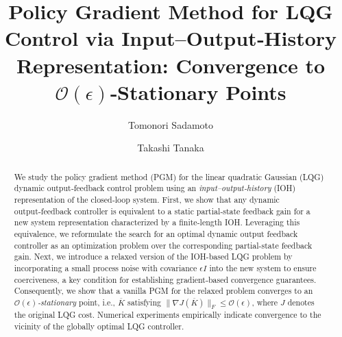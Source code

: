\documentclass[preprint,5p,times,twocolumn]{elsarticle}
\begin{document}
\begin{frontmatter}

\title{Policy Gradient Method for LQG Control via Input–Output‑History Representation: Convergence to $\mathcal{O}(\epsilon)$‑Stationary Points
}


\author[uec]{Tomonori Sadamoto}

\author[purdue]{Takashi Tanaka}




\begin{abstract}
We study the policy gradient method (PGM) for the linear quadratic Gaussian (LQG) dynamic output‑feedback control problem using an \emph{input–output‑history} (IOH) representation of the closed‑loop system. First, we show that any dynamic output‑feedback controller is equivalent to a static partial‑state feedback gain for a new system representation characterized by a finite-length IOH. Leveraging this equivalence, we reformulate the search for an optimal dynamic output feedback controller as an optimization problem over the corresponding partial-state feedback gain. 
Next, we introduce a relaxed version of the IOH-based LQG problem by incorporating a small process noise with covariance $\epsilon I$ into the new system to ensure coerciveness, a key condition for establishing gradient‑based convergence guarantees. Consequently, we show that a vanilla PGM for the relaxed problem converges to an {\it $\mathcal{O}(\epsilon)$‑stationary} point, i.e., $\overline{K}$ satisfying $\|\nabla J(\overline{K})\|_F \le \mathcal{O}(\epsilon)$, where $J$ denotes the original LQG cost. Numerical experiments empirically indicate convergence to the vicinity of the globally optimal LQG controller.
\end{abstract}


\end{frontmatter}
\end{document}
